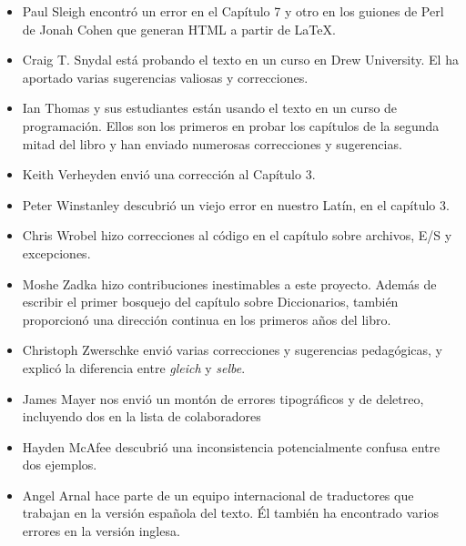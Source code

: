 \begin{itemize}
\item Paul Sleigh encontró un error en el Capítulo 7 y otro en los guiones
de Perl de Jonah Cohen que generan HTML a partir de LaTeX.



\item Craig T. Snydal está probando el texto en un curso en Drew University.
El ha aportado varias sugerencias valiosas y correcciones.

\item Ian Thomas y sus estudiantes están usando el texto en un curso de
programación. Ellos son los primeros en probar los capítulos de la
segunda mitad del libro y han enviado numerosas correcciones y sugerencias.

\item Keith Verheyden envió una corrección al Capítulo 3.

\item Peter Winstanley descubrió un viejo error en nuestro Latín, en el
capítulo 3.

\item Chris Wrobel hizo correcciones al código en el capítulo sobre archivos,
E/S y excepciones.

\item Moshe Zadka hizo contribuciones inestimables a este proyecto. Además
de escribir el primer bosquejo del capítulo sobre Diccionarios, también
proporcionó una dirección continua en los primeros años del libro.

\item Christoph Zwerschke envió varias correcciones y sugerencias pedagógicas,
y explicó la diferencia entre {\em gleich} y {\em selbe}.
\item James Mayer nos envió un montón de errores tipográficos y de deletreo,
incluyendo dos en la lista de colaboradores

\item Hayden McAfee descubrió una inconsistencia potencialmente confusa
entre dos ejemplos.
\item Angel Arnal hace parte de un equipo internacional de traductores que
trabajan en la versión española del texto. Él también ha encontrado
varios errores en la versión inglesa.
\end{itemize}

